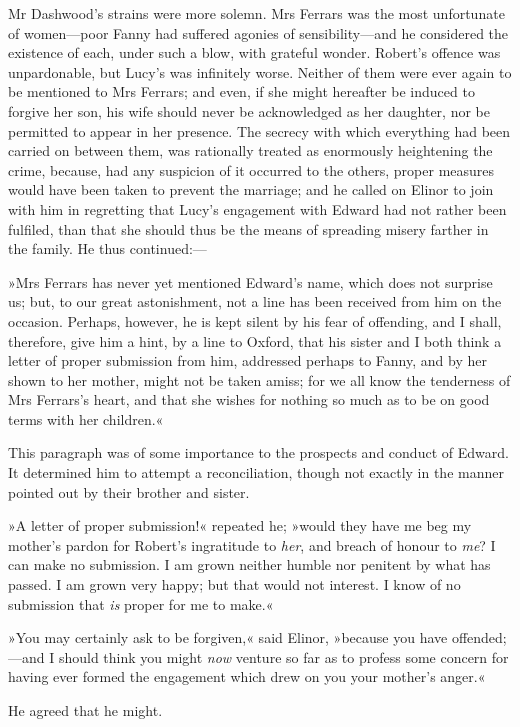 Mr Dashwood’s strains were more solemn. Mrs Ferrars was the most unfortunate of women—poor Fanny had suffered agonies of sensibility—and he considered the existence of each, under such a blow, with grateful wonder. Robert’s offence was unpardonable, but Lucy’s was infinitely worse. Neither of them were ever again to be mentioned to Mrs Ferrars; and even, if she might hereafter be induced to forgive her son, his wife should never be acknowledged as her daughter, nor be permitted to appear in her presence. The secrecy with which everything had been carried on between them, was rationally treated as enormously heightening the crime, because, had any suspicion of it occurred to the others, proper measures would have been taken to prevent the marriage; and he called on Elinor to join with him in regretting that Lucy’s engagement with Edward had not rather been fulfiled, than that she should thus be the means of spreading misery farther in the family. He thus continued:—

»Mrs Ferrars has never yet mentioned Edward’s name, which does not surprise us; but, to our great astonishment, not a line has been received from him on the occasion. Perhaps, however, he is kept silent by his fear of offending, and I shall, therefore, give him a hint, by a line to Oxford, that his sister and I both think a letter of proper submission from him, addressed perhaps to Fanny, and by her shown to her mother, might not be taken amiss; for we all know the tenderness of Mrs Ferrars’s heart, and that she wishes for nothing so much as to be on good terms with her children.«

This paragraph was of some importance to the prospects and conduct of Edward. It determined him to attempt a reconciliation, though not exactly in the manner pointed out by their brother and sister.

»A letter of proper submission!« repeated he; »would they have me beg my mother’s pardon for Robert’s ingratitude to \textit{her}, and breach of honour to \textit{me}? I can make no submission. I am grown neither humble nor penitent by what has passed. I am grown very happy; but that would not interest. I know of no submission that \textit{is} proper for me to make.«

»You may certainly ask to be forgiven,« said Elinor, »because you have offended;—and I should think you might \textit{now} venture so far as to profess some concern for having ever formed the engagement which drew on you your mother’s anger.«

He agreed that he might.

